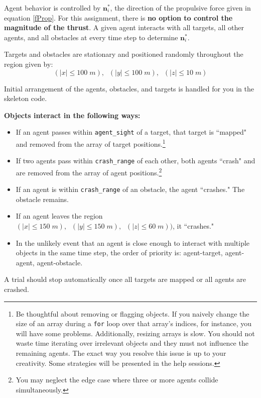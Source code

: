 \documentclass{article}
\begin{document}
Agent behavior is controlled by $\boldsymbol{n}^*_i$, the direction of the propulsive force given in equation \ref{fProp}. For this assignment, there is \textbf{no option to control the magnitude of the thrust}. A given agent interacts with all targets, all other agents, and all obstacles at every time step to determine $\boldsymbol{n}^*_i$.

Targets and obstacles are stationary and positioned randomly throughout the region given by: 
\begin{equation}
    (\vert x \vert \leq 100\;m), \;\;(\vert y\vert \leq 100 \;m),\;\; (\vert z \vert \leq 10\;m) \label{target_domain}
\end{equation}

Initial arrangement of the agents, obstacles, and targets is handled for you in the skeleton code.

\textbf{Objects interact in the following ways: }
\begin{itemize}
    \item If an agent passes within {\tt agent\_sight} of a target, that target is ``mapped" and removed from the array of target positions.\footnote{Be thoughtful about removing or flagging objects. If you naively change the size of an array during a {\tt for} loop over that array's indices, for instance, you will have some problems. Additionally, resizing arrays is slow. You should not waste time iterating over irrelevant objects and they must not influence the remaining agents. The exact way you resolve this issue is up to your creativity. Some strategies will be presented in the help sessions.}  
     \item If two agents pass within {\tt crash\_range} of each other, both agents ``crash" and are removed from the array of agent positions.\footnote{You may neglect the edge case where three or more agents collide simultaneously.}
    \item If an agent is within {\tt crash\_range} of an obstacle, the agent ``crashes." The obstacle remains. 
    \item If an agent leaves the region $(\vert x \vert \leq 150\;m), \;\;(\vert y \vert \leq 150 \;m),\;\; ( \vert z \vert \leq 60\;m))$, it ``crashes." 
    \item In the unlikely event that an agent is close enough to interact with multiple objects in the same time step, the order of priority is: agent-target, agent-agent, agent-obstacle. 
\end{itemize}

A trial should stop automatically once all targets are mapped or all agents are crashed.
\end{document}
